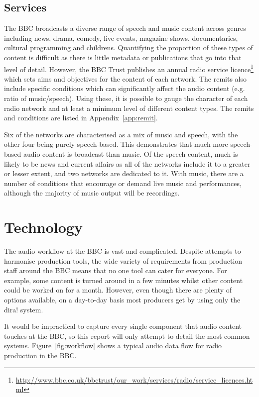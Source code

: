 \subsection{Services}
The BBC broadcasts a diverse range of speech and music content across genres
including news, drama, comedy, live events, magazine shows, documentaries,
cultural programming and childrens. Quantifying the proportion of these types
of content is difficult as there is little metadata or publications that go
into that level of detail. However, the BBC Trust publishes an annual radio
service
licence\footnote{\url{http://www.bbc.co.uk/bbctrust/our_work/services/radio/service_licences.html}}
which sets aims and objectives for the content of each network. The remits also
include specific conditions which can significantly affect the audio content
(e.g. ratio of music/speech). Using these, it is possible to gauge the
character of each radio network and at least a minimum level of different
content types. The remits and conditions are listed in
Appendix~\ref{app:remit}.

Six of the networks are characterised as a mix of music and speech, with the
other four being purely speech-based. This demonstrates that much more
speech-based audio content is broadcast than music. Of the speech content, much
is likely to be news and current affairs as all of the networks include it to a
greater or lesser extent, and two networks are dedicated to it. With music,
there are a number of conditions that encourage or demand live music and
performances, although the majority of music output will be recordings.

\section{Technology}\label{sec:workflow}
The audio workflow at the BBC is vast and complicated. Despite attempts to
harmonise production tools, the wide variety of requirements from production
staff around the BBC means that no one tool can cater for everyone. For
example, some content is turned around in a few minutes whilst other content
could be worked on for a month. However, even though there are plenty of
options available, on a day-to-day basis most producers get by using only the
dira! system.

It would be impractical to capture every single component that audio content
touches at the BBC, so this report will only attempt to detail the most common
systems.  Figure~\ref{fig:workflow} shows a typical audio data flow for radio
production in the BBC.

